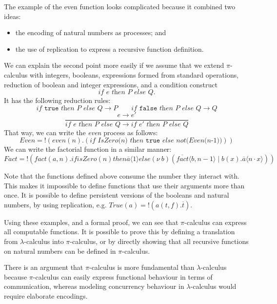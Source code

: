 \documentclass[a4paper, openany]{memoir}
\theoremstyle{definition}
\begin{document}
    The example of the even function looks complicated because it combined two ideas:
    \begin{itemize}
        \item the encoding of natural numbers as processes; and
        \item the use of replication to express a recursive function definition.
    \end{itemize}
    We can explain the second point more easily if we assume that we extend $\pi$-calculus with integers, booleans, expressions formed from standard operations, reduction of boolean and integer expressions, and a condition construct
    \[\textit{if } e \textit{ then } P \textit{ else } Q.\]
    It has the following reduction rules:
    \[\textit{if } \texttt{true} \textit{ then } P \textit{ else } Q \to P \qquad \textit{if } \texttt{false} \textit{ then } P \textit{ else } Q \to Q \]
    \[\frac{e \to e'}{\textit{if } e \textit{ then } P \textit{ else } Q \to \textit{if } e' \textit{ then } P \textit{ else } Q}\]
    That way, we can write the \textit{even} process as follows:
    \[\textit{Even} = !(
        \textit{even}(n).(\textit{if IsZero(n) then }\texttt{true} \textit{ else not(Even(n-1))})
    )\]
    We can write the factorial function in a similar manner:
    \[\textit{Fact} = !(
        \textit{fact}(a, n).if isZero(n) then \overline{a} \langle 1 \rangle 
        else (\nu \ b)(\overline{fact} \langle b, n-1 \rangle \mid b(x).\overline{a} \langle n \cdot x \rangle)
    )\]

    Note that the functions defined above consume the number they interact with. This makes it impossible to define functions that use their arguments more than once. It is possible to define persistent versions of the booleans and natural numbers, by using replication, e.g. $\textit{True}(a) = !(a(t, f).\overline{t})$.

    Using these examples, and a formal proof, we can see that $\pi$-calculus can express all computable functions. It is possible to prove this by defining a translation from $\lambda$-calculus into $\pi$-calculus, or by directly showing that all recursive functions on natural numbers can be defined in $\pi$-calculus.

    There is an argument that $\pi$-calculus is more fundamental than $\lambda$-calculus because $\pi$-calculus can easily express functional behaviour in terms of communication, whereas modeling concurrency behaviour in $\lambda$-calculus would require elaborate encodings.
    \newpage
\end{document}
